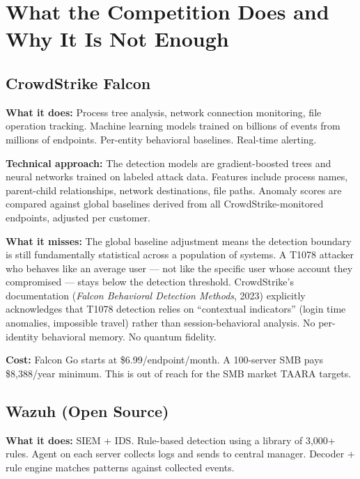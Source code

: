 \documentclass[11pt,a4paper]{article}
\begin{document}
\section{What the Competition Does and Why It Is Not Enough}

\subsection{CrowdStrike Falcon}

\textbf{What it does:} Process tree analysis, network connection monitoring, file operation tracking. Machine learning models trained on billions of events from millions of endpoints. Per-entity behavioral baselines. Real-time alerting.

\textbf{Technical approach:} The detection models are gradient-boosted trees and neural networks trained on labeled attack data. Features include process names, parent-child relationships, network destinations, file paths. Anomaly scores are compared against global baselines derived from all CrowdStrike-monitored endpoints, adjusted per customer.

\textbf{What it misses:} The global baseline adjustment means the detection boundary is still fundamentally statistical across a population of systems. A T1078 attacker who behaves like an average user — not like the specific user whose account they compromised — stays below the detection threshold. CrowdStrike's documentation (\textit{Falcon Behavioral Detection Methods}, 2023) explicitly acknowledges that T1078 detection relies on ``contextual indicators'' (login time anomalies, impossible travel) rather than session-behavioral analysis. No per-identity behavioral memory. No quantum fidelity.

\textbf{Cost:} Falcon Go starts at \$6.99/endpoint/month. A 100-server SMB pays \$8,388/year minimum. This is out of reach for the SMB market TAARA targets.

\subsection{Wazuh (Open Source)}

\textbf{What it does:} SIEM + IDS. Rule-based detection using a library of 3,000+ rules. Agent on each server collects logs and sends to central manager. Decoder + rule engine matches patterns against collected events.
\end{document}
